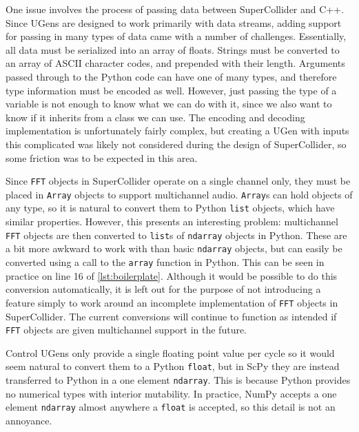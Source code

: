\documentclass{article}
\begin{document}
One issue involves the process of passing data between SuperCollider and C++. Since UGens are
designed to work primarily with data streams, adding support for passing in many types of data came
with a number of challenges. Essentially, all data must be serialized into an array of floats.
Strings must be converted to an array of ASCII character codes, and prepended with their length.
Arguments passed through to the Python code can have one of many types, and therefore type
information must be encoded as well. However, just passing the type of a variable is not enough to
know what we can do with it, since we also want to know if it inherits from a class we can use. The
encoding and decoding implementation is unfortunately fairly complex, but creating a UGen with
inputs this complicated was likely not considered during the design of SuperCollider, so some
friction was to be expected in this area.

Since \texttt{FFT} objects in SuperCollider operate on a single channel only, they must be placed
in \texttt{Array} objects to support multichannel audio. \texttt{Array}s can hold objects of any
type, so it is natural to convert them to Python \texttt{list} objects, which have similar
properties. However, this presents an interesting problem: multichannel \texttt{FFT} objects are
then converted to \texttt{list}s of \texttt{ndarray} objects in Python. These are a bit more
awkward to work with than basic \texttt{ndarray} objects, but can easily be converted using a call
to the \texttt{array} function in Python. This can be seen in practice on line 16 of
\autoref{lst:boilerplate}. Although it would be possible to do this conversion
automatically, it is left out for the purpose of not introducing a feature simply to work around an
incomplete implementation of \texttt{FFT} objects in SuperCollider. The current conversions will
continue to function as intended if \texttt{FFT} objects are given multichannel support in the
future.

Control UGens only provide a single floating point value per cycle so it would seem natural to
convert them to a Python \texttt{float}, but in ScPy they are instead transferred to Python in a
one element \texttt{ndarray}. This is because Python provides no numerical types with interior
mutability. In practice, NumPy accepts a one element \texttt{ndarray} almost anywhere a
\texttt{float} is accepted, so this detail is not an annoyance.
\end{document}
